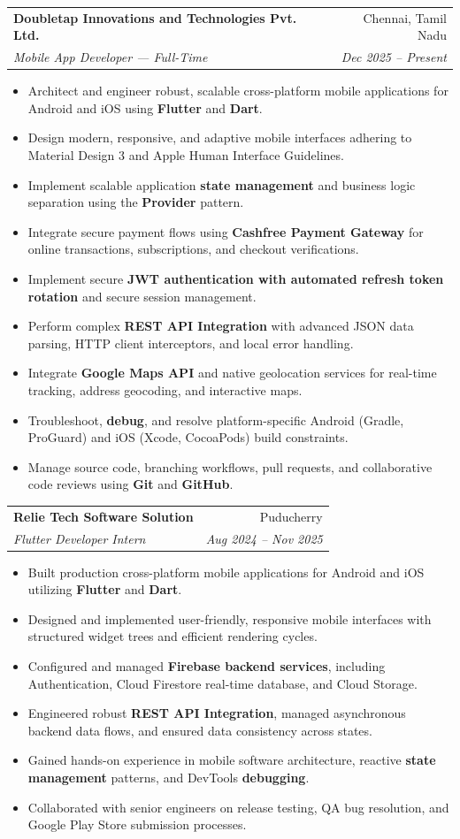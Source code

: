 \documentclass[letterpaper,10pt]{article}
\makeatletter
\newcommand{\resumeItem}[1]{
  \item\small{
    {#1}
  }
}
\newcommand{\resumeSubheading}[4]{
  \vspace{-2pt}\item
    \begin{tabular*}{0.97\textwidth}[t]{l@{\extracolsep{\fill}}r}
      \textbf{#1} & #2 \\
      \textit{\small#3} & \textit{\small #4} \\
    \end{tabular*}\vspace{-6pt}
}
\newcommand{\resumeItemListStart}{\begin{itemize}[leftmargin=0.15in, label=\tiny$\bullet$, noitemsep, topsep=1pt]}
\newcommand{\resumeItemListEnd}{\end{itemize}\vspace{-3pt}}
\makeatother
\begin{document}
    \resumeSubheading
      {Doubletap Innovations and Technologies Pvt. Ltd.}{Chennai, Tamil Nadu}
      {Mobile App Developer --- Full-Time}{Dec 2025 -- Present}
      \resumeItemListStart
        \resumeItem{Architect and engineer robust, scalable cross-platform mobile applications for Android and iOS using \textbf{Flutter} and \textbf{Dart}.}
        \resumeItem{Design modern, responsive, and adaptive mobile interfaces adhering to Material Design 3 and Apple Human Interface Guidelines.}
        \resumeItem{Implement scalable application \textbf{state management} and business logic separation using the \textbf{Provider} pattern.}
        \resumeItem{Integrate secure payment flows using \textbf{Cashfree Payment Gateway} for online transactions, subscriptions, and checkout verifications.}
        \resumeItem{Implement secure \textbf{JWT authentication with automated refresh token rotation} and secure session management.}
        \resumeItem{Perform complex \textbf{REST API Integration} with advanced JSON data parsing, HTTP client interceptors, and local error handling.}
        \resumeItem{Integrate \textbf{Google Maps API} and native geolocation services for real-time tracking, address geocoding, and interactive maps.}
        \resumeItem{Troubleshoot, \textbf{debug}, and resolve platform-specific Android (Gradle, ProGuard) and iOS (Xcode, CocoaPods) build constraints.}
        \resumeItem{Manage source code, branching workflows, pull requests, and collaborative code reviews using \textbf{Git} and \textbf{GitHub}.}
      \resumeItemListEnd

    \resumeSubheading
      {Relie Tech Software Solution}{Puducherry}
      {Flutter Developer Intern}{Aug 2024 -- Nov 2025}
      \resumeItemListStart
        \resumeItem{Built production cross-platform mobile applications for Android and iOS utilizing \textbf{Flutter} and \textbf{Dart}.}
        \resumeItem{Designed and implemented user-friendly, responsive mobile interfaces with structured widget trees and efficient rendering cycles.}
        \resumeItem{Configured and managed \textbf{Firebase backend services}, including Authentication, Cloud Firestore real-time database, and Cloud Storage.}
        \resumeItem{Engineered robust \textbf{REST API Integration}, managed asynchronous backend data flows, and ensured data consistency across states.}
        \resumeItem{Gained hands-on experience in mobile software architecture, reactive \textbf{state management} patterns, and DevTools \textbf{debugging}.}
        \resumeItem{Collaborated with senior engineers on release testing, QA bug resolution, and Google Play Store submission processes.}
      \resumeItemListEnd
\end{document}
